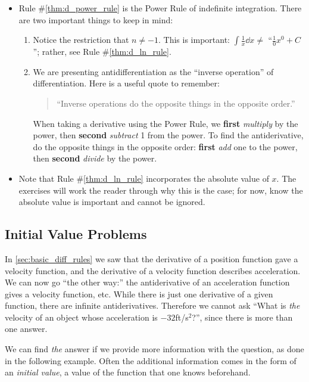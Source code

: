 \begin{itemize}
	\item	Rule \#\ref{thm:d_power_rule} is the Power Rule of indefinite integration. There are two important things to keep in mind:
	\begin{enumerate}
		\item	Notice the restriction that $n\neq -1$. This is important: $\int \frac{1}{x}\dd x \neq $ ``$\frac{1}{0}x^0+C$\primeskip''; rather, see Rule \#\ref{thm:d_ln_rule}.
		\item	We are presenting antidifferentiation as the ``inverse operation'' of differentiation. Here is a useful quote to remember:
		\begin{quote}
			``Inverse operations do the opposite things in the opposite order.''
		\end{quote}
		When taking a derivative using the Power Rule, we \textbf{first} \emph{multiply} by the power, then \textbf{second} \emph{subtract} 1 from the power. To find the antiderivative, do the opposite things in the opposite order: \textbf{first} \emph{add} one to the power, then \textbf{second} \emph{divide} by the power.
	\end{enumerate}
	\item	Note that Rule \#\ref{thm:d_ln_rule} incorporates the absolute value of $x$. The exercises will work the reader through why this is the case; for now, know the absolute value is important and cannot be ignored.
\end{itemize}

\subsection{Initial Value Problems}

In \autoref{sec:basic_diff_rules} we saw that the derivative of a position function gave a velocity function, and the derivative of a velocity function describes  acceleration. We can now go ``the other way:'' the antiderivative of an acceleration function gives a velocity function, etc. While there is just one derivative of a given function, there are infinite antiderivatives. Therefore we cannot ask ``What is \emph{the} velocity of an object whose acceleration is $-32$ft/s$^2$?'', since there is more than one answer.


We can find \emph{the} answer if we provide more information with the question, as done in the following example. Often the additional information comes in the form of an \emph{initial value}, a value of the function that one knows beforehand.


